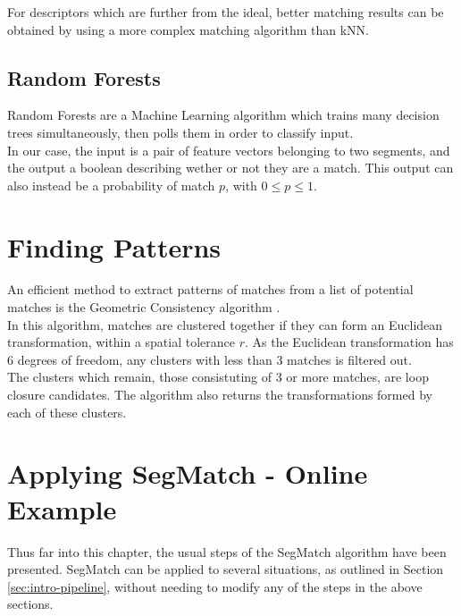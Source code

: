 For descriptors which are further from the ideal, better matching results can be obtained by using a more complex matching algorithm than kNN.

\subsection{Random Forests}
\label{subsec:RF}

Random Forests are a Machine Learning algorithm which trains many decision trees simultaneously, then polls them in order to classify input.\\

In our case, the input is a pair of feature vectors belonging to two segments, and the output a boolean describing wether or not they are a match. This output can also instead be a probability of match $p$, with $0 \leq p \leq 1$.


\section{Finding Patterns}
\label{sec:filtering}

An efficient method to extract patterns of matches from a list of potential matches is the Geometric Consistency algorithm \cite{geometric-consistency}.\\

In this algorithm, matches are clustered together if they can form an Euclidean transformation, within a spatial tolerance $r$. As the Euclidean transformation has 6 degrees of freedom, any clusters with less than 3 matches is filtered out.\\

The clusters which remain, those consistuting of 3 or more matches, are loop closure candidates. The algorithm also returns the transformations formed by each of these clusters.\\

\section{Applying SegMatch - Online Example}
\label{sec:online}

Thus far into this chapter, the usual steps of the SegMatch algorithm have been presented. SegMatch can be applied to several situations, as outlined in Section \ref{sec:intro-pipeline}, without needing to modify any of the steps in the above sections.\\

